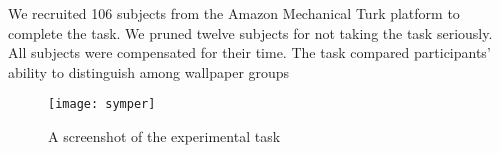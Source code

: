 We recruited 106 subjects from the Amazon Mechanical Turk platform to complete the task. We pruned twelve subjects for not taking the task seriously. All subjects were compensated for their time. The task compared participants' ability to distinguish among wallpaper groups

\begin{figure}[!ht]
\centering
\texttt{[image: symper]}
\caption{A screenshot of the experimental task}
\label{screenshot}
\end{figure}